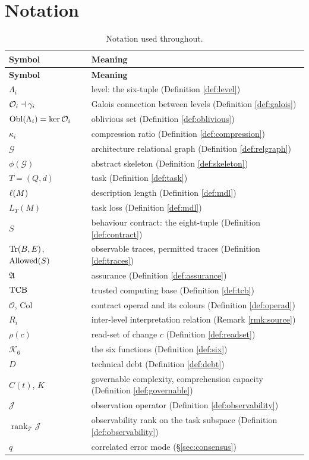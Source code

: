 \section{Notation}\label{sec:notation}

\begin{longtable}{L{3.2cm}L{11.3cm}}
\caption{Notation used throughout.}\label{tab:notation}\\
\toprule
\textbf{Symbol} & \textbf{Meaning} \\
\midrule
\endfirsthead
\toprule
\textbf{Symbol} & \textbf{Meaning} \\
\midrule
\endhead
\bottomrule
\endlastfoot
$\Lambda_i$ & level: the six-tuple (Definition \ref{def:level}) \\
$\mathcal{O}_i \dashv \gamma_i$ & Galois connection between levels (Definition \ref{def:galois}) \\
$\operatorname{Obl}(\Lambda_i) = \operatorname{ker} \mathcal{O}_i$ & oblivious set (Definition \ref{def:oblivious}) \\
$\kappa_i$ & compression ratio (Definition \ref{def:compression}) \\
$\mathcal{G}$ & architecture relational graph (Definition \ref{def:relgraph}) \\
$\phi(\mathcal{G})$ & abstract skeleton (Definition \ref{def:skeleton}) \\
$T = (Q,d)$ & task (Definition \ref{def:task}) \\
$\ell(M)$ & description length (Definition \ref{def:mdl}) \\
$L_T(M)$ & task loss (Definition \ref{def:mdl}) \\
$S$ & behaviour contract: the eight-tuple (Definition \ref{def:contract}) \\
$\operatorname{Tr}(B,E)$, $\operatorname{Allowed}(S)$ & observable traces, permitted traces
  (Definition \ref{def:traces}) \\
$\mathfrak{A}$ & assurance (Definition \ref{def:assurance}) \\
$\mathrm{TCB}$ & trusted computing base (Definition \ref{def:tcb}) \\
$\mathcal{O}$, $\mathrm{Col}$ & contract operad and its colours (Definition \ref{def:operad}) \\
$R_i$ & inter-level interpretation relation (Remark \ref{rmk:source}) \\
$\rho(c)$ & read-set of change $c$ (Definition \ref{def:readset}) \\
$\mathcal{K}_6$ & the six functions (Definition \ref{def:six}) \\
$D$ & technical debt (Definition \ref{def:debt}) \\
$C(t)$, $K$ & governable complexity, comprehension capacity
  (Definition \ref{def:governable}) \\
$\mathcal{J}$ & observation operator (Definition \ref{def:observability}) \\
$\operatorname{rank}_{\mathcal{T}}\mathcal{J}$ & observability rank on the task subspace
  (Definition \ref{def:observability}) \\
$q$ & correlated error mode (\S\ref{sec:consensus}) \\
\end{longtable}
